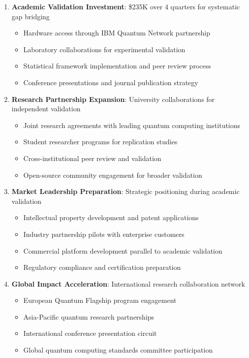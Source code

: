 \documentclass[12pt,a4paper]{article}
\begin{document}
\begin{enumerate}
    \item \textbf{Academic Validation Investment}: \$235K over 4 quarters for systematic gap bridging
    \begin{itemize}
        \item Hardware access through IBM Quantum Network partnership
        \item Laboratory collaborations for experimental validation
        \item Statistical framework implementation and peer review process
        \item Conference presentations and journal publication strategy
    \end{itemize}
    
    \item \textbf{Research Partnership Expansion}: University collaborations for independent validation
    \begin{itemize}
        \item Joint research agreements with leading quantum computing institutions
        \item Student researcher programs for replication studies
        \item Cross-institutional peer review and validation
        \item Open-source community engagement for broader validation
    \end{itemize}
    
    \item \textbf{Market Leadership Preparation}: Strategic positioning during academic validation
    \begin{itemize}
        \item Intellectual property development and patent applications
        \item Industry partnership pilots with enterprise customers
        \item Commercial platform development parallel to academic validation
        \item Regulatory compliance and certification preparation
    \end{itemize}
    
    \item \textbf{Global Impact Acceleration}: International research collaboration network
    \begin{itemize}
        \item European Quantum Flagship program engagement
        \item Asia-Pacific quantum research partnerships
        \item International conference presentation circuit
        \item Global quantum computing standards committee participation
    \end{itemize}
\end{enumerate}
\end{document}

